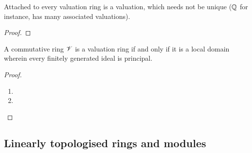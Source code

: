             \begin{lemma}
                Attached to every valuation ring is a valuation, which needs not be unique ($\mathbb{Q}$ for instance, has many associated valuations). 
            \end{lemma}
                \begin{proof}
                    
                \end{proof}
            \begin{theorem} \label{theorem: principality_and_locality_of_valuation rings}
                A commutative ring $\mathscr{V}$ is a valuation ring if and only if it is a local domain wherein every finitely generated ideal is principal.
            \end{theorem}
                \begin{proof}
                    \noindent
                    \begin{enumerate}
                        \item  
                        \item 
                    \end{enumerate}
                \end{proof}
            
    \subsection{Linearly topologised rings and modules}
